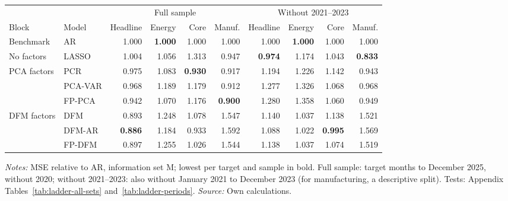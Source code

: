 \begin{threeparttable}
\begin{tabular}{@{}llrrrrrrrr@{}}
\toprule
\multicolumn{2}{c}{} & \multicolumn{4}{c}{Full sample} & \multicolumn{4}{c}{Without 2021--2023} \\
\cmidrule(lr){3-6} \cmidrule(lr){7-10}
Block & Model & Headline & Energy & Core & Manuf. & Headline & Energy & Core & Manuf. \\
\midrule
Benchmark & AR & 1.000 & \textbf{1.000} & 1.000 & 1.000 & 1.000 & \textbf{1.000} & 1.000 & 1.000 \\
\midrule
No factors & LASSO & 1.004 & 1.056 & 1.313 & 0.947 & \textbf{0.974} & 1.174 & 1.043 & \textbf{0.833} \\
\midrule
PCA factors & PCR & 0.975 & 1.083 & \textbf{0.930} & 0.917 & 1.194 & 1.226 & 1.142 & 0.943 \\
 & PCA-VAR & 0.968 & 1.189 & 1.179 & 0.912 & 1.277 & 1.326 & 1.068 & 0.968 \\
 & FP-PCA & 0.942 & 1.070 & 1.176 & \textbf{0.900} & 1.280 & 1.358 & 1.060 & 0.949 \\
\midrule
DFM factors & DFM & 0.893 & 1.248 & 1.078 & 1.547 & 1.140 & 1.037 & 1.138 & 1.521 \\
 & DFM-AR & \textbf{0.886} & 1.184 & 0.933 & 1.592 & 1.088 & 1.022 & \textbf{0.995} & 1.569 \\
 & FP-DFM & 0.897 & 1.255 & 1.026 & 1.544 & 1.138 & 1.037 & 1.074 & 1.519 \\
\bottomrule
\end{tabular}
\begin{tablenotes}[flushleft]\footnotesize
\item \textit{Notes:} MSE relative to AR, information set M; lowest per target and sample in bold. Full sample: target months to December 2025, without 2020; without 2021--2023: also without January 2021 to December 2023 (for manufacturing, a descriptive split). Tests: Appendix Tables~\ref{tab:ladder-all-sets} and~\ref{tab:ladder-periods}. \textit{Source:} Own calculations.
\end{tablenotes}
\end{threeparttable}
